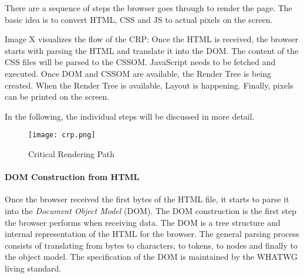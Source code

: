 
There are a sequence of steps the browser goes through to render the page.
The basic idea is to convert HTML, CSS and JS to actual pixels on the screen.

Image X visualizes the flow of the CRP:
Once the HTML is received, the browser starts with parsing the HTML and translate it into the DOM.
The content of the CSS files will be parsed to the CSSOM.
JavaScript needs to be fetched and executed.
Once DOM and CSSOM are available, the Render Tree is being created.
When the Render Tree is available, Layout is happening.
Finally, pixels can be printed on the screen.

In the following, the individual steps will be discussed in more detail.


\begin{figure}[h!]
\begin{center}
\texttt{[image: crp.png]}
\caption{Critical Rendering Path}
\label{img:crp}
\end{center}
\end{figure}






\paragraph{DOM Construction from HTML}


Once the browser received the first bytes of the HTML file, it starts to parse it into the \textit{Document Object Model} (DOM).
The DOM construction is the first step the browser performs when receiving data.
The DOM is a tree structure and internal representation of the HTML for the browser. %
The general parsing process consists of translating from bytes to characters, to tokens, to nodes and finally to the object model.%
The specification of the DOM is maintained by the WHATWG living standard. %

